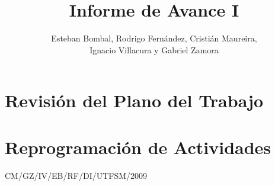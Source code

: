 \documentclass[12pt,letterpaper]{article}
\title{Informe de Avance I}
\author{Esteban Bombal, Rodrigo Fernández, Cristián Maureira,\\Ignacio Villacura y Gabriel Zamora}
\begin{document}

\maketitle\thispagestyle{empty}

\section{Revisión del Plano del Trabajo}
\label{op:revision}


\newpage
\section{Reprogramación de Actividades}
\label{target:reprogramacion}


\vfill \hfill CM/GZ/IV/EB/RF/DI/UTFSM/2009
\end{document}

